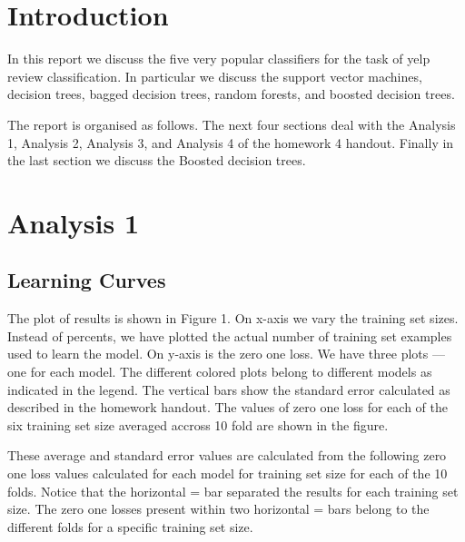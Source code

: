 \documentclass[12pt]{article}
\begin{document}
\maketitle

\newpage

\section{Introduction}

In this report we discuss the five very popular classifiers for the task of yelp review
classification. In particular we discuss the support vector machines, decision trees,
bagged decision trees, random forests, and boosted decision trees.

The report is organised as follows. The next four sections deal with the Analysis 1,
Analysis 2, Analysis 3, and Analysis 4 of the homework 4 handout. Finally in the last
section we discuss the Boosted decision trees.

\section{Analysis 1}

\subsection{Learning Curves}
The plot of results is shown in Figure 1. On x-axis we vary the training set sizes. Instead
of percents, we have plotted the actual number of training set examples used to learn
the model. On y-axis is the zero one loss. We have three plots --- one for each model.
The different colored plots belong to different models as indicated in the legend.
The vertical bars show the standard error calculated as
described in the homework handout. The values of zero one loss for each of the six 
training set size averaged accross 10 fold are shown in the figure.

These average and standard error values are calculated from the following zero
one loss values calculated for each model for training set size for each of the 10 folds.
Notice that the horizontal = bar separated the results for each training set size. The
zero one losses present within two horizontal = bars belong to the different folds for
a specific training set size.\\
\end{document}
